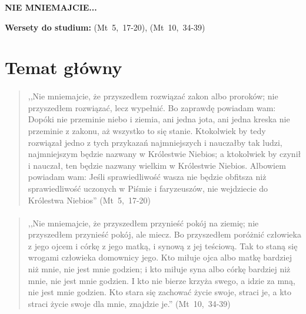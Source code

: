 \documentclass[10pt,a4paper,oneside]{article}
\begin{document}
\centerline{\textbf{\MakeUppercase{Nie mniemajcie...}}}
\begin{center}
\textbf{Wersety do studium:} 
\mbox{(Mt 5, 17-20)}, \mbox{(Mt 10, 34-39)}
\end{center}
\section{Temat główny}
\paragraph{}
\begin{quote}
,,Nie mniemajcie, że przyszedłem rozwiązać zakon albo proroków; nie przyszedłem rozwiązać, lecz wypełnić. Bo zaprawdę powiadam wam: Dopóki nie przeminie niebo i ziemia, ani jedna jota, ani jedna kreska nie przeminie z zakonu, aż wszystko to się stanie. Ktokolwiek by tedy rozwiązał jedno z tych przykazań najmniejszych i nauczałby tak ludzi, najmniejszym będzie nazwany w Królestwie Niebios; a ktokolwiek by czynił i nauczał, ten będzie nazwany wielkim w Królestwie Niebios. Albowiem powiadam wam: Jeśli sprawiedliwość wasza nie będzie obfitsza niż sprawiedliwość uczonych w Piśmie i faryzeuszów, nie wejdziecie do Królestwa Niebios'' \mbox{(Mt 5, 17-20)}
\end{quote}
\paragraph{}
\begin{quote}
,,Nie mniemajcie, że przyszedłem przynieść pokój na ziemię; nie przyszedłem przynieść pokój, ale miecz. Bo przyszedłem poróżnić człowieka z jego ojcem i córkę z jego matką, i synową z jej teściową. Tak to staną się wrogami człowieka domownicy jego. Kto miłuje ojca albo matkę bardziej niż mnie, nie jest mnie godzien; i kto miłuje syna albo córkę bardziej niż mnie, nie jest mnie godzien. I kto nie bierze krzyża swego, a idzie za mną, nie jest mnie godzien. Kto stara się zachować życie swoje, straci je, a kto straci życie swoje dla mnie, znajdzie je.'' \mbox{(Mt 10, 34-39)}
\end{quote}
\end{document}
